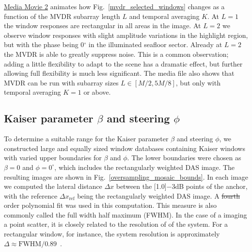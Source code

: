 \documentclass[10pt,journal,draftclsnofoot,onecolumn]{IEEEtran}
\newcommand\Fig[1]{Fig.~\ref{#1}}
\newcommand\1{\vec 1}
\newcommand\minus{\scalebox{0.75}[1.0]{$-$}}
\newcommand\multimedia[2]{\href{#1}{#2}}
\newcommand\mediaPath{gfx/media} %
\newcommand\mediaII{\multimedia{\mediaPath/media2.mp4}{Media Movie 2}} %
\providecommand{\DIFadd}[1]{{\protect\color{blue}\uwave{#1}}} %
\providecommand{\DIFdel}[1]{{\protect\color{red}\sout{#1}}}                      %
\providecommand{\DIFaddbegin}{} %
\providecommand{\DIFaddend}{} %
\providecommand{\DIFdelbegin}{} %
\providecommand{\DIFdelend}{} %
\begin{document}
\mediaII{} animates how \Fig{mvdr_selected_windows} changes as a function of the MVDR subarray length $L$ and temporal averaging $K$. At $L=1$ the window responses are rectangular in all areas in the image. At $L=2$ we observe window responses with slight amplitude variations in the highlight region, but with the phase being 0$^\circ$ in the illuminated seafloor sector. Already at $L=2$ the MVDR is able to greatly suppress noise. This is a common observation; adding a little flexibility to adapt to the scene has a dramatic effect, but further allowing full flexibility is much less significant. The media file also shows that MVDR can be run with subarray sizes $L\in[M/2,5M/8]$, but only with temporal averaging $K=1$ or above.



\subsection{Kaiser parameter $\beta$ and steering $\phi$}\label{sec:results_window_parameters}

To determine a suitable range for the Kaiser parameter $\beta$ and steering $\phi$, we constructed large and equally sized window databases containing Kaiser windows with varied upper boundaries for $\beta$ and $\phi$. The lower boundaries were chosen as $\beta=0$ and $\phi=0^\circ$, which includes the rectangularly weighted DAS image. The resulting images are shown in \Fig{oversampling_mosaic_bounds}. In each image we computed the lateral distance $\Delta x$ between the \minus{}3dB points of the anchor, with the reference $\Delta x_\text{ref}$ being the rectangularly weighted DAS image. A \DIFdelbegin \DIFdel{fourth }\DIFdelend \DIFaddbegin \DIFadd{forth }\DIFaddend order polynomial fit was used in this computation. This measure is also commonly called the full width half maximum (FWHM). In the case of a imaging a point scatter, it is closely related to the resolution of of the system. For a rectangular window, for instance, the system resolution is approximately $\Delta \approx \text{FWHM}/0.89$~\cite{Harris1978}.
\end{document}
